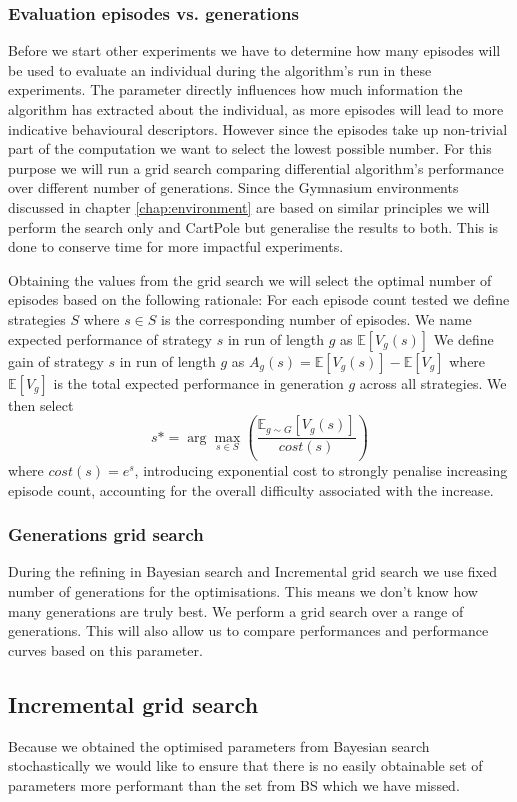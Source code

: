 \subsubsection{Evaluation episodes vs. generations}
\label{sec:evalEps}
Before we start other experiments we have to determine how many episodes will be used to evaluate an individual during the algorithm's run in these experiments. The parameter directly influences how much information the algorithm has extracted about the individual, as more episodes will lead to more indicative behavioural descriptors. However since the episodes take up non-trivial part of the computation we want to select the lowest possible number. For this purpose we will run a grid search comparing differential algorithm's performance over different number of generations. Since the Gymnasium environments discussed in chapter \ref{chap:environment} are based on similar principles we will perform the search only and CartPole but generalise the results to both. This is done to conserve time for more impactful experiments. 

Obtaining the values from the grid search we will select the optimal number of episodes based on the following rationale:
For each episode count tested we define strategies $S$ where $s\in S$ is the corresponding number of episodes.
We name expected performance of strategy $s$ in run of length $g$ as $\mathbb{E}[V_g(s)]$
We define gain of strategy $s$ in run of length $g$ as $A_g(s) = \mathbb{E}[V_g(s)] - \mathbb{E}[V_g]$ where $\mathbb{E}[V_g]$ is the total expected performance in generation $g$ across all strategies.
We then select $$s* = \arg\max_{s\in S}\left(\frac{\mathbb{E}_{g\sim G}[V_g(s)]}{cost(s)}\right) $$ where $cost(s) = e^{s}$, introducing exponential cost to strongly penalise increasing episode count, accounting for the overall difficulty associated with the increase.

\subsubsection{Generations grid search}
\label{sec:preGenSearch}
During the refining in Bayesian search and Incremental grid search we use fixed number of generations for the optimisations. This means we don't know how many generations are truly best. We perform a grid search over a range of generations. This will also allow us to compare performances and performance curves based on this parameter.
  
\subsection{Incremental grid search}
\label{sec:incgridsearch}
Because we obtained the optimised parameters from Bayesian search stochastically we would like to ensure that there is no easily obtainable set of parameters more performant than the set from BS which we have missed. 

